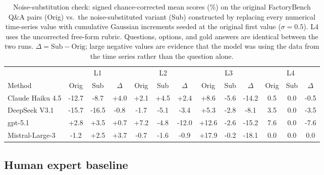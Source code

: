 \begin{table}[htbp]
    \centering
    \caption{Noise-substitution check: signed chance-corrected mean scores (\%) on the original FactoryBench Q\&A pairs (Orig) vs.\ the noise-substituted variant (Sub) constructed by replacing every numerical time-series value with cumulative Gaussian increments seeded at the original first value ($\sigma=0.5$). L4 uses the uncorrected free-form rubric. Questions, options, and gold answers are identical between the two runs. $\Delta = \text{Sub} - \text{Orig}$; large negative values are evidence that the model was using the data from the time series rather than the question alone.}
    \label{tab:noise_substitution}
    \scriptsize
    \begin{tabular}{@{}l ccc ccc ccc ccc@{}}
        \toprule
                         & \multicolumn{3}{c}{L1} & \multicolumn{3}{c}{L2} & \multicolumn{3}{c}{L3} & \multicolumn{3}{c}{L4}                                                                    \\
        \cmidrule(lr){2-4}\cmidrule(lr){5-7}\cmidrule(lr){8-10}\cmidrule(lr){11-13}
        Method           & Orig                   & Sub                    & $\Delta$               & Orig                   & Sub  & $\Delta$ & Orig & Sub  & $\Delta$ & Orig & Sub & $\Delta$ \\
        \midrule
        Claude Haiku 4.5 & -12.7                  & -8.7                   & +4.0                   & +2.1                   & +4.5 & +2.4     & +8.6 & -5.6 & -14.2    & 0.5  & 0.0 & -0.5     \\
        DeepSeek V3.1    & -15.7                  & -16.5                  & -0.8                   & -1.7                   & -5.1 & -3.4     & +5.3 & -2.8 & -8.1     & 3.5  & 0.0 & -3.5     \\
        gpt-5.1          & +2.8                   & +3.5                   & +0.7                   & +7.2                   & -4.8 & -12.0    &+12.6 & -2.6 & -15.2    & 7.6  & 0.0 & -7.6     \\
        Mistral-Large-3  & -1.2                   & +2.5                   & +3.7                   & -0.7                   & -1.6 & -0.9     &+17.9 & -0.2 & -18.1    & 0.0  & 0.0 &  0.0     \\
        \bottomrule
    \end{tabular}
\end{table}

\subsection{Human expert baseline}
\label{app:human_baseline}

